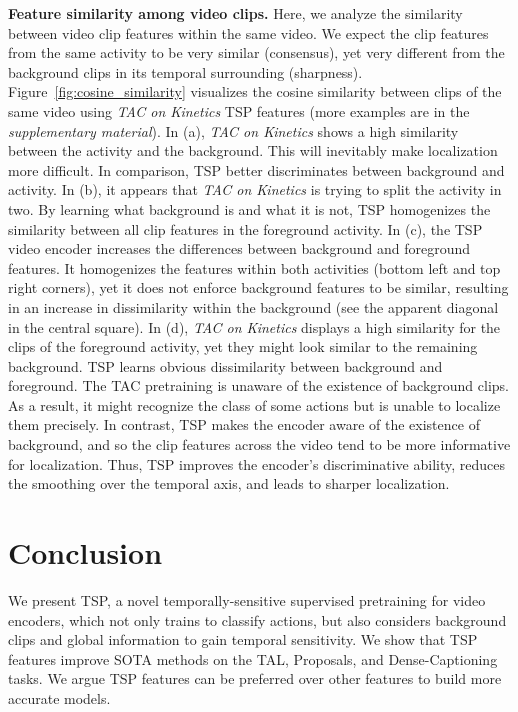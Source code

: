 \documentclass[10pt,twocolumn,letterpaper]{article}
\begin{document}
\vspace{3pt}\noindent\textbf{Feature similarity among video clips.}
Here, we analyze the similarity between video clip features within the same video. We expect the clip features from the same activity to be very similar (consensus), yet very different from the background clips in its temporal surrounding (sharpness).
Figure~\ref{fig:cosine_similarity} visualizes the cosine similarity between clips of the same video using \textit{TAC on Kinetics} \vs TSP features (more examples are in the \emph{supplementary material}). In (a), \textit{TAC on Kinetics} shows a high similarity between the activity and the background. This will inevitably make localization more difficult. In comparison, TSP better discriminates between background and activity. In (b), it appears that \textit{TAC on Kinetics} is trying to split the activity in two. By learning what background is and what it is not, TSP homogenizes the similarity between all clip features in the foreground activity. In (c), the TSP video encoder increases the differences between background and foreground features. It homogenizes the features within both activities (bottom left and top right corners), yet it does not enforce background features to be similar, resulting in an increase in dissimilarity within the background (see the apparent diagonal in the central square).  In (d), \textit{TAC on Kinetics} displays a high similarity for the clips of the foreground activity, yet they might look similar to the remaining background. TSP learns obvious dissimilarity between background and foreground. 
The TAC pretraining is unaware of the existence of background clips. As a result, it might recognize the class of some actions but is unable to localize them precisely. In contrast, TSP makes the encoder aware of the existence of background, and so the clip features across the video tend to be more informative for localization. Thus, TSP improves the encoder's discriminative ability, reduces the smoothing over the temporal axis, and leads to sharper localization.
 \section{Conclusion}\label{sec:conclusion}
We present TSP, a novel temporally-sensitive supervised pretraining for video encoders, which not only trains to classify actions, but also considers background clips and global information to gain temporal sensitivity. We show that TSP features improve SOTA methods on the TAL, Proposals, and Dense-Captioning tasks. We argue TSP features can be preferred over other features to build more accurate models.
\end{document}
